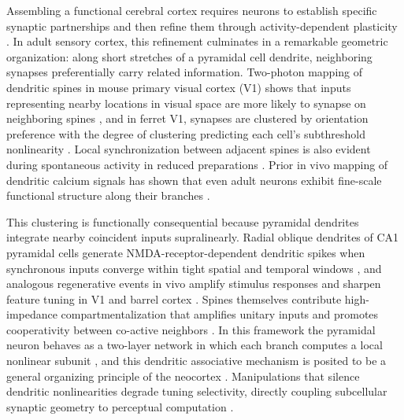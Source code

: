 \documentclass[11pt]{article}
\begin{document}
Assembling a functional cerebral cortex requires neurons to establish specific synaptic partnerships and then refine them through activity-dependent plasticity \citep{sanes2020synaptic}. In adult sensory cortex, this refinement culminates in a remarkable geometric organization: along short stretches of a pyramidal cell dendrite, neighboring synapses preferentially carry related information. Two-photon mapping of dendritic spines in mouse primary visual cortex (V1) shows that inputs representing nearby locations in visual space are more likely to synapse on neighboring spines \citep{iacaruso2017synaptic}, and in ferret V1, synapses are clustered by orientation preference with the degree of clustering predicting each cell's subthreshold nonlinearity \citep{wilson2016orientation}. Local synchronization between adjacent spines is also evident during spontaneous activity in reduced preparations \citep{takahashi2012locally}. Prior in vivo mapping of dendritic calcium signals has shown that even adult neurons exhibit fine-scale functional structure along their branches \citep{jia2010dendritic}.

This clustering is functionally consequential because pyramidal dendrites integrate nearby coincident inputs supralinearly. Radial oblique dendrites of CA1 pyramidal cells generate NMDA-receptor-dependent dendritic spikes when synchronous inputs converge within tight spatial and temporal windows \citep{losonczy2006integrative}, and analogous regenerative events in vivo amplify stimulus responses and sharpen feature tuning in V1 and barrel cortex \citep{smith2013dendritic,lavzin2012nonlinear}. Spines themselves contribute high-impedance compartmentalization that amplifies unitary inputs and promotes cooperativity between co-active neighbors \citep{harnett2012synaptic}. In this framework the pyramidal neuron behaves as a two-layer network in which each branch computes a local nonlinear subunit \citep{poirazi2003pyramidal,makara2013variable}, and this dendritic associative mechanism is posited to be a general organizing principle of the neocortex \citep{larkum2013cellular}. Manipulations that silence dendritic nonlinearities degrade tuning selectivity, directly coupling subcellular synaptic geometry to perceptual computation \citep{smith2013dendritic,lavzin2012nonlinear,wilson2018differential}.
\end{document}
